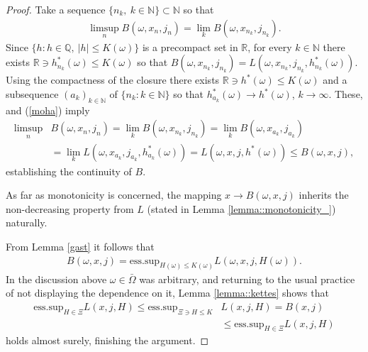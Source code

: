 \documentclass[a4paper]{article}
\begin{document}
\begin{proof}
Take a sequence $\{n_k, \ k\in\mathbb{N}\} \subset \mathbb{N}$ so that
\begin{align}\label{moha}
\limsup_{n}B(\omega,x_n,j_n) = \lim_{k}B(\omega,x_{n_k},j_{n_k}).
\end{align}
Since $\{h : h\in\mathbb{Q}, \ |h|\leq K(\omega) \}$ is a precompact set in $\mathbb{R}$, for every 
$k\in\mathbb{N}$ there exists $\mathbb{R} \ni h_{n_k}^{*}(\omega) \leq K(\omega)$ so that 
$B(\omega,x_{n_k},j_{n_k}) = L(\omega,x_{n_k},j_{n_k},h_{n_k}^{*}(\omega))$. Using  the compactness of the 
closure there exists $\mathbb{R}\ni h^*(\omega) \leq K(\omega)$ and a subsequence 
$(a_k)_{k\in\mathbb{N}}$ of $\{n_k : k\in\mathbb{N}\}$ so 
that $h^{*}_{a_k}(\omega) \to h^*(\omega)$, $k\to\infty$. These, and (\ref{moha}) imply
\begin{align*}
\limsup_{n} & B(\omega,x_n,j_n) = \lim_{k}B(\omega,x_{n_k},j_{n_k}) = \lim_{k}B(\omega,x_{a_k},j_{a_k})
\\
&
= \lim_{k}L(\omega,x_{a_k},j_{a_k},h_{a_k}^{*}(\omega)) = L(\omega,x,j,h^{*}(\omega)) \leq B(\omega,x,j),
\end{align*}
establishing the continuity of $B$. 

As far as monotonicity is concerned, the mapping $x \to B(\omega,x,j)$ inherits the 
non-decreasing property from $L$ (stated in Lemma \ref{lemma::monotonicity_}) naturally.

From Lemma \ref{gast} it follows that
\begin{align*}
B(\omega,x,j) = \mbox{ess.sup}_{H(\omega) \leq K(\omega)} L(\omega, x,j, H(\omega)).
\end{align*}
In the discussion above $\omega \in \bar \Omega$ was arbitrary, and returning to the usual practice of not displaying the dependence on it, Lemma \ref{lemma::kettes} shows that 
\begin{align*}
\mbox{ess.sup}_{H \in \Xi} L( x,j, H)  \leq \mbox{ess.sup}_{\Xi \ni H \leq K}& L(x,j, H) = B(x,j) 
 \\
 &\leq
 \mbox{ess.sup}_{H \in \Xi} L( x,j, H)
\end{align*}
holds almost surely, finishing the argument.

\end{proof}
\end{document}
